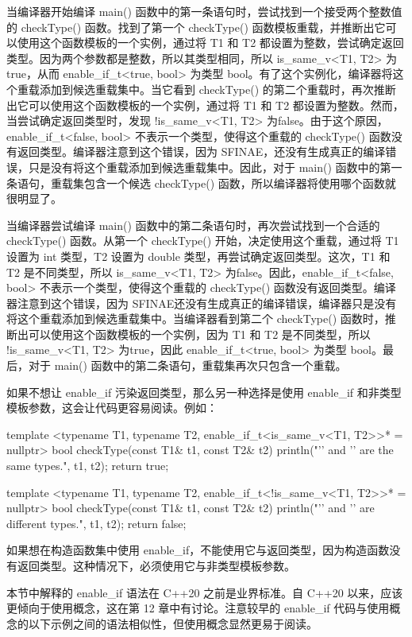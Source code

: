 当编译器开始编译 main() 函数中的第一条语句时，尝试找到一个接受两个整数值的 checkType() 函数。找到了第一个 checkType() 函数模板重载，并推断出它可以使用这个函数模板的一个实例，通过将 T1 和 T2 都设置为整数，尝试确定返回类型。因为两个参数都是整数，所以其类型相同，所以 is\_same\_v<T1, T2> 为true，从而 enable\_if\_t<true, bool> 为类型 bool。有了这个实例化，编译器将这个重载添加到候选重载集中。当它看到 checkType() 的第二个重载时，再次推断出它可以使用这个函数模板的一个实例，通过将 T1 和 T2 都设置为整数。然而，当尝试确定返回类型时，发现 !is\_same\_v<T1, T2> 为false。由于这个原因，enable\_if\_t<false, bool> 不表示一个类型，使得这个重载的 checkType() 函数没有返回类型。编译器注意到这个错误，因为 SFINAE，还没有生成真正的编译错误，只是没有将这个重载添加到候选重载集中。因此，对于 main() 函数中的第一条语句，重载集包含一个候选 checkType() 函数，所以编译器将使用哪个函数就很明显了。

当编译器尝试编译 main() 函数中的第二条语句时，再次尝试找到一个合适的 checkType() 函数。从第一个 checkType() 开始，决定使用这个重载，通过将 T1 设置为 int 类型，T2 设置为 double 类型，再尝试确定返回类型。这次，T1 和 T2 是不同类型，所以 is\_same\_v<T1, T2> 为false。因此，enable\_if\_t<false, bool> 不表示一个类型，使得这个重载的 checkType() 函数没有返回类型。编译器注意到这个错误，因为 SFINAE还没有生成真正的编译错误，编译器只是没有将这个重载添加到候选重载集中。当编译器看到第二个 checkType() 函数时，推断出可以使用这个函数模板的一个实例，因为 T1 和 T2 是不同类型，所以 !is\_same\_v<T1, T2> 为true，因此 enable\_if\_t<true, bool> 为类型 bool。最后，对于 main() 函数中的第二条语句，重载集再次只包含一个重载。

如果不想让 enable\_if 污染返回类型，那么另一种选择是使用 enable\_if 和非类型模板参数，这会让代码更容易阅读。例如：

\begin{cpp}
template <typename T1, typename T2, enable_if_t<is_same_v<T1, T2>>* = nullptr>
bool checkType(const T1& t1, const T2& t2)
{
    println("'{}' and '{}' are the same types.", t1, t2);
    return true;
}

template <typename T1, typename T2, enable_if_t<!is_same_v<T1, T2>>* = nullptr>
bool checkType(const T1& t1, const T2& t2)
{
    println("'{}' and '{}' are different types.", t1, t2);
    return false;
}
\end{cpp}

如果想在构造函数集中使用 enable\_if，不能使用它与返回类型，因为构造函数没有返回类型。这种情况下，必须使用它与非类型模板参数。

本节中解释的 enable\_if 语法在 C++20 之前是业界标准。自 C++20 以来，应该更倾向于使用概念，这在第 12 章中有讨论。注意较早的 enable\_if 代码与使用概念的以下示例之间的语法相似性，但使用概念显然更易于阅读。

